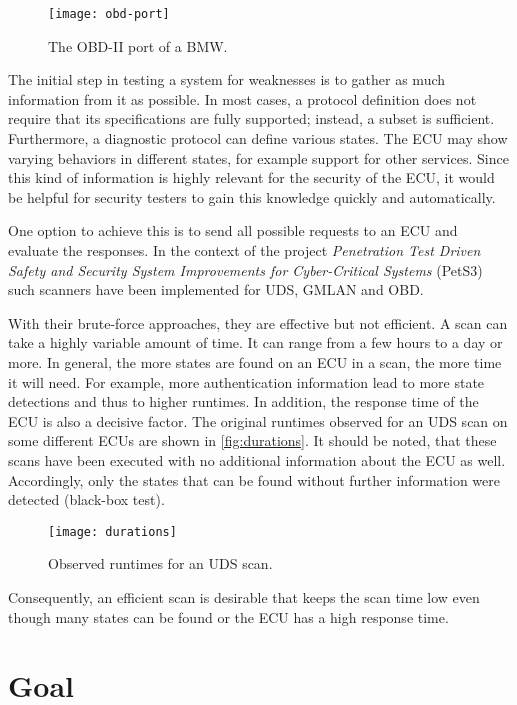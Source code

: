 \begin{figure}[htb]
    \centering
    \texttt{[image: obd-port]}
    \caption{The OBD-II port of a BMW.}
    \label{fig:obd-port}
\end{figure}

The initial step in testing a system for weaknesses is to gather as much information from it as possible. In most cases, a protocol definition does not require that its specifications are fully supported; instead, a subset is sufficient.
Furthermore, a diagnostic protocol can define various states. The ECU may show varying behaviors in different states, for example support for other services. Since this kind of information is highly relevant for the security of the ECU, it would be helpful for security testers to gain this knowledge quickly and automatically.

One option to achieve this is to send all possible requests to an ECU and evaluate the responses. In the context of the project \emph{Penetration Test Driven Safety and Security System Improvements for Cyber-Critical Systems} (PetS3) \cite{pets3} such scanners have been implemented for UDS, GMLAN and OBD.

With their brute-force approaches, they are effective but not efficient. A scan can take a highly variable amount of time. It can range from a few hours to a day or more. In general, the more states are found on an ECU in a scan, the more time it will need. For example, more authentication information lead to more state detections and thus to higher runtimes. In addition, the response time of the ECU is also a decisive factor. The original runtimes observed for an UDS scan on some different ECUs are shown in \autoref{fig:durations}. It should be noted, that these scans have been executed with no additional information about the ECU as well. Accordingly, only the states that can be found without further information were detected (black-box test).

\begin{figure}[htb]
    \centering
    \texttt{[image: durations]}
    \caption{Observed runtimes for an UDS scan.}
    \label{fig:durations}
\end{figure}

Consequently, an efficient scan is desirable that keeps the scan time low even though many states can be found or the ECU has a high response time.

\section{Goal}

